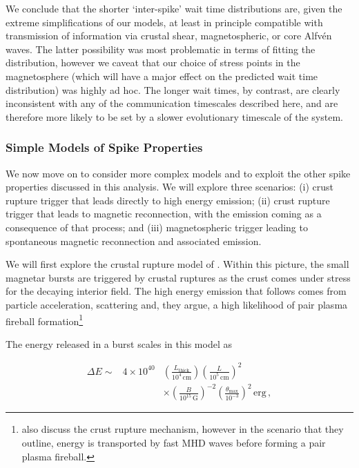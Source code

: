 \documentclass[12pt]{emulateapj}
\begin{document}



We conclude that the shorter `inter-spike' wait time distributions are, given the extreme simplifications of our models, at least in principle 
compatible with transmission of information via crustal shear, magnetospheric, or core Alfv\'en waves.  The latter possibility was most 
problematic in terms of fitting the distribution, however we caveat that our choice of stress points in the magnetosphere (which will have a 
major effect on the predicted wait time distribution) was highly ad hoc.   The longer wait times, by contrast, are clearly inconsistent with any 
of the communication timescales described here, and are therefore more likely to be set by a slower evolutionary timescale of the system.  

\subsubsection{Simple Models of Spike Properties}
We now move on to consider more complex models and to exploit the other spike properties discussed in this analysis. We will explore three 
scenarios: (i) crust rupture trigger that leads directly to high energy emission; (ii) crust rupture trigger that leads to magnetic reconnection, 
with the emission coming as a consequence of that process; and (iii) magnetospheric trigger leading to spontaneous magnetic reconnection 
and associated emission.

We will first explore the crustal rupture model of \citet{thompson1995}. Within this picture, the small magnetar bursts are triggered by crustal 
ruptures as the crust comes under stress for the decaying interior field. The high energy emission that follows comes from particle acceleration, 
scattering and, they argue, a high likelihood of pair plasma fireball formation\footnote{\citet{heyl2005b} also discuss the crust rupture mechanism, 
however in the scenario that they outline, energy is transported by fast MHD waves before forming a pair plasma fireball.}

The energy released in a burst scales in this model \citep[Equation 28ff.\ in ][]{thompson1995} as 

\begin{eqnarray}
\Delta E \sim & 4\times 10^{40} & \left(\frac{L_{\mathrm{thick}}}{10^{4}\,\mathrm{cm}} \right) \left( \frac{L}{10^{5}\,\mathrm{cm}}\right)^2  \\ \nonumber
&& \times \left( \frac{B}{10^{15}\,\mathrm{G}}\right)^{-2} \left(\frac{\theta_\mathrm{max}}{10^{-3}}\right)^2 \, \mathrm{erg} \, ,
\end{eqnarray}
\end{document}

